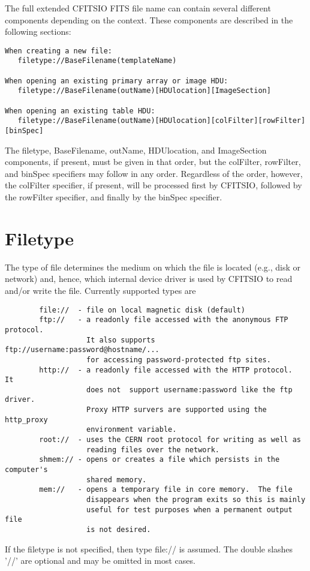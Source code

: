 \documentclass[11pt]{book}
\begin{document}
The full extended CFITSIO FITS file name can contain several different
components depending on the context.  These components are described in
the following sections:

\begin{verbatim}
When creating a new file:
   filetype://BaseFilename(templateName)

When opening an existing primary array or image HDU:
   filetype://BaseFilename(outName)[HDUlocation][ImageSection]

When opening an existing table HDU:
   filetype://BaseFilename(outName)[HDUlocation][colFilter][rowFilter][binSpec]
\end{verbatim}
The filetype, BaseFilename, outName, HDUlocation, and ImageSection
components, if present, must be given in that order, but the colFilter,
rowFilter, and binSpec specifiers may follow in any order.  Regardless
of the order, however, the colFilter specifier, if present, will be
processed first by CFITSIO, followed by the rowFilter specifier, and
finally by the binSpec specifier.


\section{Filetype}

The type of file determines the medium on which the file is located
(e.g., disk or network) and, hence, which internal device driver is used by
CFITSIO to read and/or write the file.  Currently supported types are

\begin{verbatim}
        file://  - file on local magnetic disk (default)
        ftp://   - a readonly file accessed with the anonymous FTP protocol.
                   It also supports  ftp://username:password@hostname/...
                   for accessing password-protected ftp sites.
        http://  - a readonly file accessed with the HTTP protocol.  It
                   does not  support username:password like the ftp driver.
                   Proxy HTTP survers are supported using the http_proxy
                   environment variable.
        root://  - uses the CERN root protocol for writing as well as
                   reading files over the network.
        shmem:// - opens or creates a file which persists in the computer's
                   shared memory.
        mem://   - opens a temporary file in core memory.  The file
                   disappears when the program exits so this is mainly
                   useful for test purposes when a permanent output file
                   is not desired.
\end{verbatim}
If the filetype is not specified, then type file:// is assumed.
The double slashes '//' are optional and may be omitted in most cases.
\end{document}
